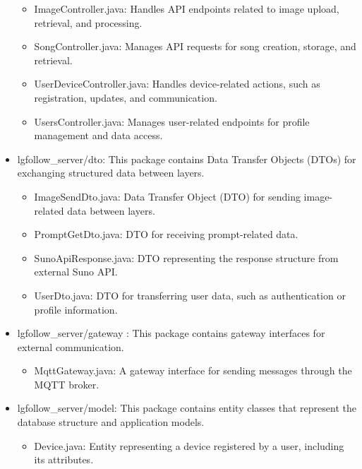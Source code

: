 \documentclass[conference]{IEEEtran}
\begin{document}
\begin{itemize}
    \begin{itemize}
        \item ImageController.java: Handles API endpoints related to image upload, retrieval, and processing. \\
        \item SongController.java: Manages API requests for song creation, storage, and retrieval. \\
        \item UserDeviceController.java: Handles device-related actions, such as registration, updates, and communication. \\
        \item UsersController.java: Manages user-related endpoints for profile management and data access. \\
    \end{itemize}
    \item lgfollow\_server/dto: This package contains Data Transfer Objects (DTOs) for exchanging structured data between layers.
    \begin{itemize}
        \item ImageSendDto.java: Data Transfer Object (DTO) for sending image-related data between layers. \\
        \item PromptGetDto.java: DTO for receiving prompt-related data. \\
        \item SunoApiResponse.java: DTO representing the response structure from external Suno API. \\
        \item UserDto.java: DTO for transferring user data, such as authentication or profile information.
    \end{itemize}
    \item lgfollow\_server/gateway : This package contains gateway interfaces for external communication.
    \begin{itemize}
        \item MqttGateway.java: A gateway interface for sending messages through the MQTT broker. \\
    \end{itemize}
    \item lgfollow\_server/model: This package contains entity classes that represent the database structure and application models.
    \begin{itemize}
        \item Device.java: Entity representing a device registered by a user, including its attributes. \\

\end{itemize}
\end{itemize}
\end{document}
